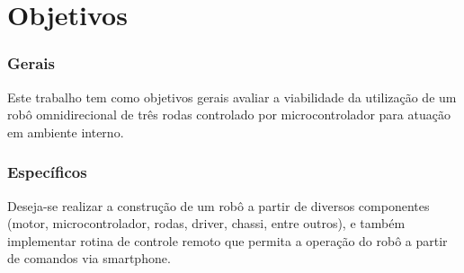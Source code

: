 \chapter{Objetivos}

\subsection*{Gerais}
Este trabalho tem como objetivos gerais avaliar a viabilidade da utilização de 
um robô omnidirecional de três rodas controlado por microcontrolador para 
atuação em ambiente interno.

\subsection*{Específicos}
Deseja-se realizar a construção de um robô a partir de diversos componentes 
(motor, microcontrolador, rodas, driver, chassi, entre outros), e também 
implementar rotina de controle remoto que permita a operação do robô a partir de 
comandos via smartphone.